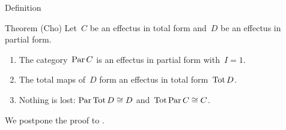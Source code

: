 \documentclass[b]{subfiles}
\begin{document}
\begin{parsec}
\begin{point}{Definition}
\begin{point}
\end{point}
\end{point}
\begin{point}{Theorem (Cho)}%
Let~$C$ be an effectus in total form
and~$D$ be an effectus in partial form.
\begin{enumerate}
\item
The category~$\operatorname{Par} C$ is an effectus in partial form
        with~$I = 1$.
\item
The total maps of~$D$ form an effectus in total form~$\operatorname{Tot} D$.
\item
    Nothing is lost:
    $\operatorname{Par} \operatorname{Tot} D \cong D$ and~$\operatorname{Tot} \operatorname{Par} C \cong C$.
\end{enumerate}
\begin{point}%
We postpone the proof to .
\end{point}
\end{point}
\end{parsec}
\end{document}
